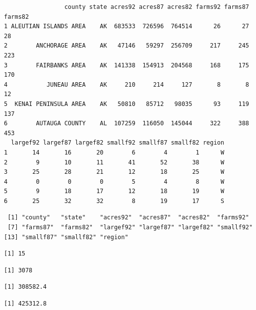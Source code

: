 \documentclass[
  letterpaper,
  DIV=11,
  numbers=noendperiod]{scrreprt}
\renewcommand{\[}{\begin{equation}}
\renewcommand{\]}{\end{equation}}
\begin{document}
\begin{verbatim}
                 county state acres92 acres87 acres82 farms92 farms87 farms82
1 ALEUTIAN ISLANDS AREA    AK  683533  726596  764514      26      27      28
2        ANCHORAGE AREA    AK   47146   59297  256709     217     245     223
3        FAIRBANKS AREA    AK  141338  154913  204568     168     175     170
4           JUNEAU AREA    AK     210     214     127       8       8      12
5  KENAI PENINSULA AREA    AK   50810   85712   98035      93     119     137
6        AUTAUGA COUNTY    AL  107259  116050  145044     322     388     453
  largef92 largef87 largef82 smallf92 smallf87 smallf82 region
1       14       16       20        6        4        1      W
2        9       10       11       41       52       38      W
3       25       28       21       12       18       25      W
4        0        0        0        5        4        8      W
5        9       18       17       12       18       19      W
6       25       32       32        8       19       17      S
\end{verbatim}

\begin{verbatim}
 [1] "county"   "state"    "acres92"  "acres87"  "acres82"  "farms92" 
 [7] "farms87"  "farms82"  "largef92" "largef87" "largef82" "smallf92"
[13] "smallf87" "smallf82" "region"  
\end{verbatim}

\begin{verbatim}
[1] 15
\end{verbatim}

\begin{verbatim}
[1] 3078
\end{verbatim}

\begin{verbatim}
[1] 308582.4
\end{verbatim}

\begin{verbatim}
[1] 425312.8
\end{verbatim}
\end{document}

